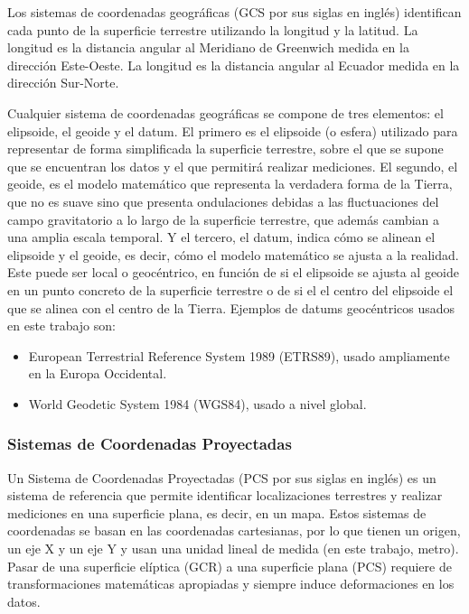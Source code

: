 \documentclass[12pt,a4paper,]{book}
\providecommand{\tightlist}{%
  \setlength{\itemsep}{0pt}\setlength{\parskip}{0pt}}
\numberwithin{dummy}{section}
\theoremstyle{ocrenumbox}
\theoremstyle{blacknumex}
\theoremstyle{blacknumbox}
\theoremstyle{ocrenum}
\theoremstyle{ocrenum}
\begin{document}
Los sistemas de coordenadas geográficas (GCS por sus siglas en inglés)
identifican cada punto de la superficie terrestre utilizando la longitud
y la latitud. La longitud es la distancia angular al Meridiano de
Greenwich medida en la dirección Este-Oeste. La longitud es la distancia
angular al Ecuador medida en la dirección Sur-Norte.

Cualquier sistema de coordenadas geográficas se compone de tres
elementos: el elipsoide, el geoide y el datum. El primero es el
elipsoide (o esfera) utilizado para representar de forma simplificada la
superficie terrestre, sobre el que se supone que se encuentran los datos
y el que permitirá realizar mediciones. El segundo, el geoide, es el
modelo matemático que representa la verdadera forma de la Tierra, que no
es suave sino que presenta ondulaciones debidas a las fluctuaciones del
campo gravitatorio a lo largo de la superficie terrestre, que además
cambian a una amplia escala temporal. Y el tercero, el datum, indica
cómo se alinean el elipsoide y el geoide, es decir, cómo el modelo
matemático se ajusta a la realidad. Este puede ser local o geocéntrico,
en función de si el elipsoide se ajusta al geoide en un punto concreto
de la superficie terrestre o de si el el centro del elipsoide el que se
alinea con el centro de la Tierra. Ejemplos de datums geocéntricos
usados en este trabajo son:

\begin{itemize}
\tightlist
\item
  European Terrestrial Reference System 1989 (ETRS89), usado ampliamente
  en la Europa Occidental.
\item
  World Geodetic System 1984 (WGS84), usado a nivel global.
\end{itemize}

\hypertarget{sistemas-de-coordenadas-proyectadas}{%
\subsubsection{Sistemas de Coordenadas
Proyectadas}\label{sistemas-de-coordenadas-proyectadas}}

Un Sistema de Coordenadas Proyectadas (PCS por sus siglas en inglés) es
un sistema de referencia que permite identificar localizaciones
terrestres y realizar mediciones en una superficie plana, es decir, en
un mapa. Estos sistemas de coordenadas se basan en las coordenadas
cartesianas, por lo que tienen un origen, un eje X y un eje Y y usan una
unidad lineal de medida (en este trabajo, metro). Pasar de una
superficie elíptica (GCR) a una superficie plana (PCS) requiere de
transformaciones matemáticas apropiadas y siempre induce deformaciones
en los datos.
\end{document}
